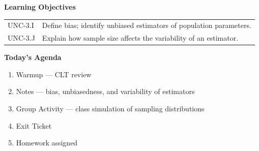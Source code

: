 \documentclass[10pt]{article}
\begin{document}
\namedateperiod

\begin{objectivebox}
\textbf{Learning Objectives}

\medskip
\begin{tabularx}{\linewidth}{@{} l X @{}}
UNC-3.I & Define bias; identify unbiased estimators of population parameters.\\[4pt]
UNC-3.J & Explain how sample size affects the variability of an estimator.\\
\end{tabularx}
\end{objectivebox}

\begin{tocbox}
\textbf{Today's Agenda}
\begin{enumerate}
  \item Warmup — CLT review
  \item Notes — bias, unbiasedness, and variability of estimators
  \item Group Activity — class simulation of sampling distributions
  \item Exit Ticket
  \item Homework assigned
\end{enumerate}
\end{tocbox}
\end{document}
